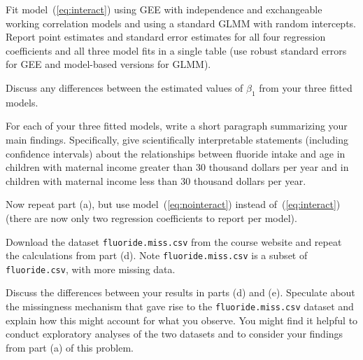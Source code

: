 \documentclass[11pt, letterpaper]{article}
\begin{document}
\begin{enumerate}[(a)]
{\em \item  Fit model~(\ref{eq:interact}) using GEE with independence and exchangeable working
correlation models and using a standard GLMM with random intercepts.  Report point estimates and standard error estimates 
for all four regression coefficients and all three model fits in a single table (use robust standard errors for GEE and model-based versions for GLMM).}
{\em \item Discuss any differences between the estimated values of $\beta_1$ from your three fitted models.}
{\em \item For each of your three fitted models, write a short paragraph summarizing your main findings.  Specifically, give scientifically interpretable statements (including confidence intervals) about the relationships between fluoride intake and age
in children with maternal income greater than 30 thousand dollars per year and
in children with maternal income less than 30 thousand dollars per year.}
{\em \item Now repeat part (a), but use model~(\ref{eq:nointeract}) instead of~(\ref{eq:interact}) (there are now only two regression coefficients to report per model).}
{\em \item Download the dataset \texttt{fluoride.miss.csv} from the course website and repeat the calculations from part (d).  Note \texttt{fluoride.miss.csv} is a subset of \texttt{fluoride.csv}, with more missing data.}
{\em \item  Discuss the differences between your results in parts (d) and (e).  Speculate
about the missingness mechanism that gave rise to the \texttt{fluoride.miss.csv} dataset and 
explain how this might account for what you observe.  You might find it
helpful to conduct exploratory analyses of the two datasets and to consider your findings from part (a) of
this problem.
}

\end{enumerate}
\end{document}
